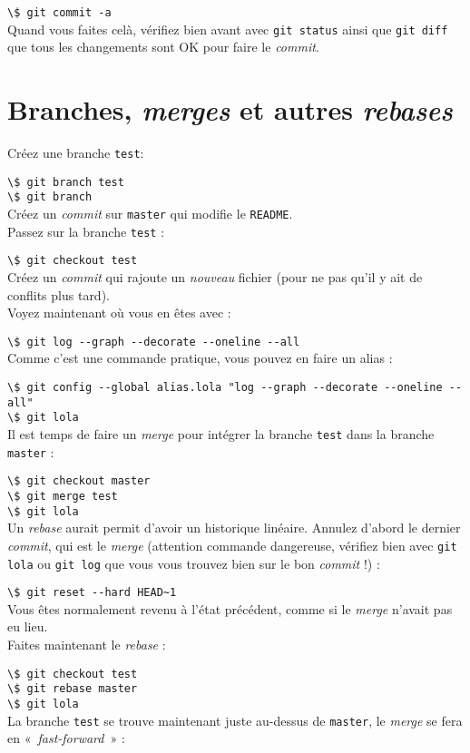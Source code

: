 \documentclass[a4paper,11pt]{article}
\newcommand{\code}[1]{\lstinline{#1}}
\newcommand{\shell}[1]{\hspace*{1cm}\lstinline{\$ #1}\\}
\begin{document}
\shell{git commit -a}

Quand vous faites celà, vérifiez bien avant avec \code{git status} ainsi que \code{git diff} que tous les changements sont OK pour faire le \emph{commit}.

\section{Branches, \emph{merges} et autres \emph{rebases}}
Créez une branche \code{test}:

\shell{git branch test}
\shell{git branch}

Créez un \emph{commit} sur \code{master} qui modifie le \texttt{README}.\\

Passez sur la branche \code{test} :

\shell{git checkout test}

Créez un \emph{commit} qui rajoute un \emph{nouveau} fichier (pour ne pas qu'il y ait de conflits plus tard).\\

Voyez maintenant où vous en êtes avec :

\shell{git log --graph --decorate --oneline --all}

Comme c'est une commande pratique, vous pouvez en faire un alias :

\shell{git config --global alias.lola "log --graph --decorate --oneline --all"}
\shell{git lola}

Il est temps de faire un \emph{merge} pour intégrer la branche \code{test} dans la branche \code{master} :

\shell{git checkout master}
\shell{git merge test}
\shell{git lola}

Un \textit{rebase} aurait permit d'avoir un historique linéaire. Annulez d'abord le dernier \emph{commit}, qui est le \emph{merge} (attention commande dangereuse, vérifiez bien avec \code{git lola} ou \code{git log} que vous vous trouvez bien sur le bon \emph{commit} !) :

\shell{git reset --hard HEAD~1}

Vous êtes normalement revenu à l'état précédent, comme si le \emph{merge} n'avait pas eu lieu.\\
Faites maintenant le \textit{rebase} :

\shell{git checkout test}
\shell{git rebase master}
\shell{git lola}

La branche \code{test} se trouve maintenant juste au-dessus de \code{master}, le \emph{merge} se fera en «~\textit{fast-forward}~» :
\end{document}
